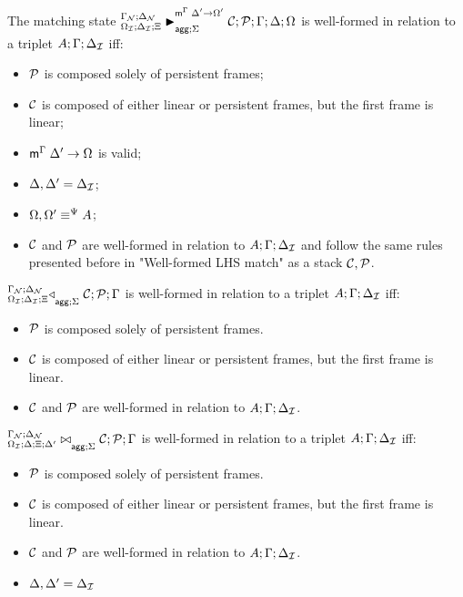 \begin{definition}
The matching state $\matstatea{\deltan}{\lstack{C};
      \lstack{P}}{\Gamma}{\Delta}{\Omega}{\Delta' \rightarrow
         \Omega'}{\Sigma}$
is well-formed in relation to a triplet $A; \Gamma; \deltan$ iff:

\begin{itemize}[leftmargin=*]
   \item $\lstack{P}$ is composed solely of persistent frames;
   \item $\lstack{C}$ is composed of either linear or persistent frames, but the first
   frame is linear;
   \item $\mz{\Gamma}{\Delta'}{\Omega}$ is valid;
   \item $\Delta, \Delta' = \deltan$;
   \item $\feqa{\Omega, \Omega'}{A}{\Psi}{\Psi}$;
   \item $\lstack{C}$ and $\lstack{P}$ are well-formed in relation to $A; \Gamma; \deltan$ and
   follow the same rules presented before in "Well-formed LHS match" as a stack
   $\lstack{C}, \lstack{P}$.
\end{itemize}
\end{definition}


\begin{definition}
$\contstatea{\deltan}{\lstack{C} ; \lstack{P}}{\Gamma}{\Sigma}$ is well-formed
in relation to a triplet $A; \Gamma; \deltan$ iff:

\begin{itemize}[leftmargin=*]
   \item $\lstack{P}$ is composed solely of persistent frames.
   \item $\lstack{C}$ is composed of either linear or persistent frames, but the first
   frame is linear.
   \item $\lstack{C}$ and $\lstack{P}$ are well-formed in relation to $A; \Gamma; \deltan$.
\end{itemize}
\end{definition}

\begin{definition}
$\fixstatea{\Delta}{\Xi; \Delta'}{\lstack{C}; \lstack{P}}{\Gamma}{\Sigma}$ is
well-formed in relation to a triplet $A; \Gamma; \deltan$ iff:

\begin{itemize}[leftmargin=*]
   \item $\lstack{P}$ is composed solely of persistent frames.
   \item $\lstack{C}$ is composed of either linear or persistent frames, but the first
   frame is linear.
   \item $\lstack{C}$ and $\lstack{P}$ are well-formed in relation to $A; \Gamma; \deltan$.
   \item $\Delta, \Delta' = \deltan$
\end{itemize}
\end{definition}

